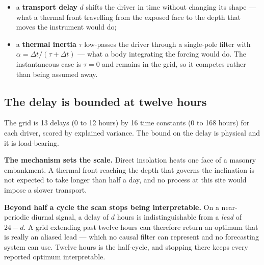 \documentclass[11pt,a4paper]{article}
\begin{document}
\begin{itemize}
\item a \textbf{transport delay} $d$ shifts the driver in time without changing
its shape --- what a thermal front travelling from the exposed face to the depth
that moves the instrument would do;
\item a \textbf{thermal inertia} $\tau$ low-passes the driver through a
single-pole filter with $\alpha = \Delta t/(\tau + \Delta t)$ --- what a body
integrating the forcing would do. The instantaneous case is $\tau = 0$ and
remains in the grid, so it competes rather than being assumed away.
\end{itemize}

\subsection{The delay is bounded at twelve hours}
\label{sec:cap}

The grid is 13 delays (0 to 12 hours) by 16 time constants (0 to 168 hours) for
each driver, scored by explained variance. The bound on the delay is physical and
it is load-bearing.

\textbf{The mechanism sets the scale.} Direct insolation heats one face of a
masonry embankment. A thermal front reaching the depth that governs the
inclination is not expected to take longer than half a day, and no process at
this site would impose a slower transport.

\textbf{Beyond half a cycle the scan stops being interpretable.} On a
near-periodic diurnal signal, a delay of $d$ hours is indistinguishable from a
\emph{lead} of $24 - d$. A grid extending past twelve hours can therefore return
an optimum that is really an aliased lead --- which no causal filter can
represent and no forecasting system can use. Twelve hours is the half-cycle, and
stopping there keeps every reported optimum interpretable.
\end{document}
